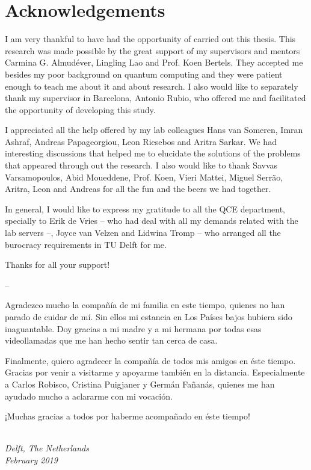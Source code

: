 \chapter*{Acknowledgements}

I am very thankful to have had the opportunity of carried out this thesis.
This research was made possible by the great support of my supervisors and mentors Carmina G. Almudéver, Lingling Lao and Prof. Koen Bertels.
They accepted me besides my poor background on quantum computing and they were patient enough to teach me about it and about research.
I also would like to separately thank my supervisor in Barcelona, Antonio Rubio, who offered me and facilitated the opportunity of developing this study.

I appreciated all the help offered by my lab colleagues Hans van Someren, Imran Ashraf, Andreas Papageorgiou, Leon Riesebos and Aritra Sarkar.
We had interesting discussions that helped me to elucidate the solutions of the problems that appeared through out the research.
I also would like to thank Savvas Varsamopoulos, Abid Moueddene, Prof. Koen, Vieri Mattei, Miguel Serrão, Aritra, Leon and Andreas for all the fun and the beers we had together.

In general, I would like to express my gratitude to all the QCE department, specially to Erik de Vries -- who had deal with all my demands related with the lab servers --, Joyce van Velzen and Lidwina Tromp -- who arranged all the burocracy requirements in TU Delft for me.

Thanks for all your support!

--

Agradezco mucho la compañía de mi familia en este tiempo, quienes no han parado de cuidar de mí.
Sin ellos mi estancia en Los Países bajos hubiera sido inaguantable.
Doy gracias a mi madre y a mi hermana por todas esas videollamadas que me han hecho sentir tan cerca de casa.

Finalmente, quiero agradecer la compañía de todos mis amigos en éste tiempo.
Gracias por venir a visitarme y apoyarme también en la distancia.
Especialmente a Carlos Robisco, Cristina Puigjaner y Germán Fañanás, quienes me han ayudado mucho a aclararme con mi vocación.

¡Muchas gracias a todos por haberme acompañado en éste tiempo!

\begin{flushright}
{\makeatletter\itshape
    \@author \\
    Delft, The Netherlands \\
    February 2019
\makeatother}
\end{flushright}
